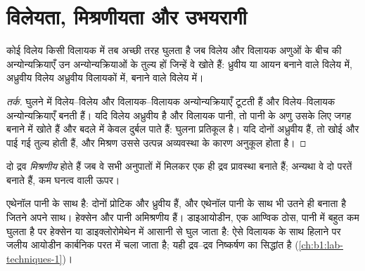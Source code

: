 \section{विलेयता, मिश्रणीयता और उभयरागी}

\begin{proposition}[समान, समान को घोलता है]\label{prop:b1:intermolecular-forces-solvents:like}
कोई विलेय किसी विलायक में तब अच्छी तरह घुलता है जब विलेय और
विलायक अणुओं के बीच की अन्योन्यक्रियाएँ उन अन्योन्यक्रियाओं के तुल्य हों जिन्हें वे खोते हैं: ध्रुवीय या
आयन बनाने वाले विलेय  में, अध्रुवीय विलेय अध्रुवीय
विलायकों में,  बनाने वाले विलेय  में।
\end{proposition}

\begin{proof}[तर्क]
घुलने में विलेय--विलेय और विलायक--विलायक अन्योन्यक्रियाएँ टूटती हैं और
विलेय--विलायक अन्योन्यक्रियाएँ बनती हैं। यदि विलेय अध्रुवीय है और विलायक पानी,
तो पानी के अणु उसके लिए जगह बनाने में  खोते हैं और बदले में केवल
दुर्बल  पाते हैं: घुलना प्रतिकूल है। यदि
दोनों अध्रुवीय हैं, तो खोई और पाई गई  तुल्य होती हैं,
और मिश्रण उससे उत्पन्न अव्यवस्था के कारण अनुकूल होता है।
\end{proof}

\begin{definition}[मिश्रणीय द्रव]\label{def:b1:intermolecular-forces-solvents:miscibility}
दो द्रव \emph{मिश्रणीय} होते हैं जब वे सभी
अनुपातों में मिलकर एक ही द्रव प्रावस्था बनाते हैं; अन्यथा वे दो परतें बनाते हैं,
कम घनत्व वाली ऊपर।
\end{definition}

\begin{example}[पानी के साथ एथेनॉल, पानी के साथ हेक्सेन]\label{ex:b1:intermolecular-forces-solvents:miscible}
एथेनॉल पानी के साथ  है: दोनों प्रोटिक और ध्रुवीय हैं, और एथेनॉल
पानी के साथ भी उतने ही  बनाता है जितने अपने साथ। हेक्सेन और पानी
अमिश्रणीय हैं। डाइआयोडीन, एक आण्विक ठोस, पानी में बहुत कम घुलता है पर
हेक्सेन या डाइक्लोरोमेथेन में आसानी से घुल जाता है: ऐसे
विलायक के साथ हिलाने पर जलीय आयोडीन कार्बनिक परत में चला जाता है; यही
द्रव--द्रव निष्कर्षण का सिद्धांत है (\cref{ch:b1:lab-techniques-1})।
\end{example}

